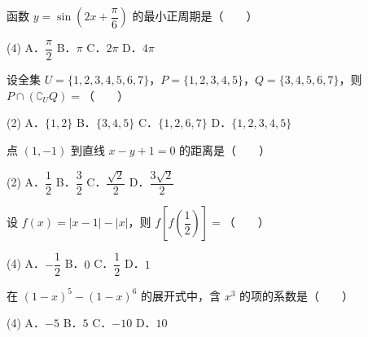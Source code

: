 
\begin{question}
函数 $y = \sin\left(2x + \dfrac{\pi}{6}\right)$ 的最小正周期是\mbox{（　　）}

\begin{gkopts}(4)
\task A．$\dfrac{\pi}{2}$
\task B．$\pi$
\task C．$2\pi$
\task D．$4\pi$
\end{gkopts}

\end{question}
\begin{question}
设全集 $U = \{1, 2, 3, 4, 5, 6, 7\}$，$P = \{1, 2, 3, 4, 5\}$，$Q = \{3, 4, 5, 6, 7\}$，则 $P \cap (\complement_U Q) =$\mbox{（　　）}

\begin{gkopts}(2)
\task A．$\{1, 2\}$
\task B．$\{3, 4, 5\}$
\task C．$\{1, 2, 6, 7\}$
\task D．$\{1, 2, 3, 4, 5\}$
\end{gkopts}

\end{question}
\begin{question}
点 $(1, -1)$ 到直线 $x - y + 1 = 0$ 的距离是\mbox{（　　）}

\begin{gkopts}(2)
\task A．$\dfrac{1}{2}$
\task B．$\dfrac{3}{2}$
\task C．$\dfrac{\sqrt{2}}{2}$
\task D．$\dfrac{3\sqrt{2}}{2}$
\end{gkopts}

\end{question}
\begin{question}
设 $f(x) = |x - 1| - |x|$，则 $f\left[f\left(\dfrac{1}{2}\right)\right] =$\mbox{（　　）}

\begin{gkopts}(4)
\task A．$-\dfrac{1}{2}$
\task B．$0$
\task C．$\dfrac{1}{2}$
\task D．$1$
\end{gkopts}

\end{question}
\begin{question}
在 $(1 - x)^5 - (1 - x)^6$ 的展开式中，含 $x^3$ 的项的系数是\mbox{（　　）}

\begin{gkopts}(4)
\task A．$-5$
\task B．$5$
\task C．$-10$
\task D．$10$
\end{gkopts}

\end{question}
